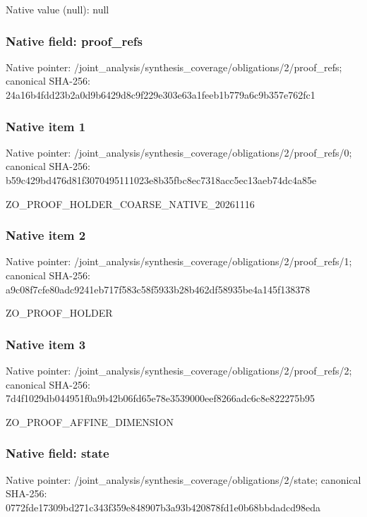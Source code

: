 \documentclass[10pt,a4paper]{article}
\begin{document}
Native value (null): null

\subsubsection{Native field: proof\_\allowbreak{}refs}
Native pointer: /joint\_\allowbreak{}analysis/synthesis\_\allowbreak{}coverage/obligations/2/proof\_\allowbreak{}refs; canonical SHA-256: 24a16b4fdd23b2a0d9b6429d8c9f229e303e63a1feeb1b779a6c9b357e762fc1

\subsubsection{Native item 1}
Native pointer: /joint\_\allowbreak{}analysis/synthesis\_\allowbreak{}coverage/obligations/2/proof\_\allowbreak{}refs/0; canonical SHA-256: b59c429bd476d81f3070495111023e8b35fbc8ec7318acc5ec13aeb74dc4a85e

\begingroup\raggedright\sloppy ZO\_\allowbreak{}PROOF\_\allowbreak{}HOLDER\_\allowbreak{}COARSE\_\allowbreak{}NATIVE\_\allowbreak{}20261116\par\endgroup

\subsubsection{Native item 2}
Native pointer: /joint\_\allowbreak{}analysis/synthesis\_\allowbreak{}coverage/obligations/2/proof\_\allowbreak{}refs/1; canonical SHA-256: a9c08f7cfe80adc9241eb717f583c58f5933b28b462df58935be4a145f138378

\begingroup\raggedright\sloppy ZO\_\allowbreak{}PROOF\_\allowbreak{}HOLDER\par\endgroup

\subsubsection{Native item 3}
Native pointer: /joint\_\allowbreak{}analysis/synthesis\_\allowbreak{}coverage/obligations/2/proof\_\allowbreak{}refs/2; canonical SHA-256: 7d4f1029db044951f0a9b42b06fd65e78e3539000eef8266adc6c8e822275b95

\begingroup\raggedright\sloppy ZO\_\allowbreak{}PROOF\_\allowbreak{}AFFINE\_\allowbreak{}DIMENSION\par\endgroup

\subsubsection{Native field: state}
Native pointer: /joint\_\allowbreak{}analysis/synthesis\_\allowbreak{}coverage/obligations/2/state; canonical SHA-256: 0772fde17309bd271c343f359e848907b3a93b420878fd1e0b68bbdadcd98eda
\end{document}
